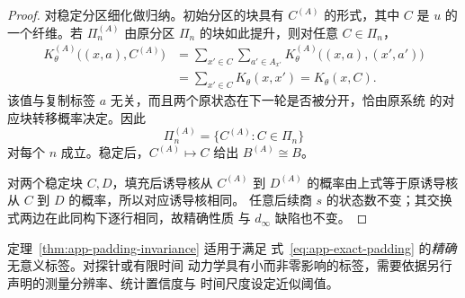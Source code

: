 \begin{proof}
对稳定分区细化做归纳。初始分区的块具有
$C^{(A)}$ 的形式，其中 $C$ 是 $u$ 的一个纤维。若 $\Pi_n^{(A)}$
由原分区 $\Pi_n$ 的块如此提升，则对任意 $C\in\Pi_n$，
\begin{align*}
 K_\theta^{(A)}\bigl((x,a),C^{(A)}\bigr)
 &=\sum_{x'\in C}\sum_{a'\in A_{x'}}
   K_\theta^{(A)}\bigl((x,a),(x',a')\bigr)\\
 &=\sum_{x'\in C}K_\theta(x,x')
 =K_\theta(x,C).
\end{align*}
该值与复制标签 $a$ 无关，而且两个原状态在下一轮是否被分开，恰由原系统
的对应块转移概率决定。因此
\[
  \Pi_n^{(A)}=\{C^{(A)}:C\in\Pi_n\}
\]
对每个 $n$ 成立。稳定后，$C^{(A)}\mapsto C$ 给出
$B^{(A)}\cong B$。

对两个稳定块 $C,D$，填充后诱导核从 $C^{(A)}$ 到 $D^{(A)}$
的概率由上式等于原诱导核从 $C$ 到 $D$ 的概率，所以对应诱导核相同。
任意后续商 $s$ 的状态数不变；其交换式两边在此同构下逐行相同，故精确性质
与 $d_\infty$ 缺陷也不变。
\end{proof}

定理~\ref{thm:app-padding-invariance} 适用于满足
式~\eqref{eq:app-exact-padding} 的\emph{精确}无意义标签。对探针或有限时间
动力学具有小而非零影响的标签，需要依据另行声明的测量分辨率、统计置信度与
时间尺度设定近似阈值。
